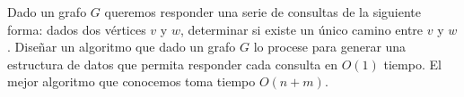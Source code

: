  \item Dado un grafo $G$ queremos responder una serie de consultas de la siguiente forma: dados dos vértices $v$ y $w$, determinar si existe un único camino entre $v$ y $w$.  Diseñar un algoritmo que dado un grafo $G$ lo procese para generar una estructura de datos que permita responder cada consulta en $O(1)$ tiempo.  El mejor algoritmo que conocemos toma tiempo $O(n+m)$.


